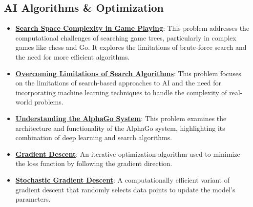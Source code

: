 \documentclass{article}%
\begin{document}
%
\subsection{AI Algorithms \& Optimization}%
\label{subsec:AIAlgorithmsOptimization}%
\begin{itemize}[leftmargin=*]%
\item \href{\url{https://purdue.brightspace.com/d2l/common/assets/pdfjs-d2l-dist/1.0.14-legacy/web/viewer.html?file=\%252Fcontent\%252Fenforced\%252F1095467-wl.202510.CS.24300.001\%252F02L2-Intro.pdf\%253Fou\%253D1095467\&lang=en-us\&container=d2l-fileviewer-rendered-pdf\&fullscreen=d2l-fileviewer-rendered-pdf-dialog\&height=667}#page=11}{\textbf{Search Space Complexity in Game Playing}}: This problem addresses the computational challenges of searching game trees, particularly in complex games like chess and Go. It explores the limitations of brute-force search and the need for more efficient algorithms.%
\item \href{\url{https://purdue.brightspace.com/d2l/common/assets/pdfjs-d2l-dist/1.0.14-legacy/web/viewer.html?file=\%252Fcontent\%252Fenforced\%252F1095467-wl.202510.CS.24300.001\%252F02L2-Intro.pdf\%253Fou\%253D1095467\&lang=en-us\&container=d2l-fileviewer-rendered-pdf\&fullscreen=d2l-fileviewer-rendered-pdf-dialog\&height=667}#page=12}{\textbf{Overcoming Limitations of Search Algorithms}}: This problem focuses on the limitations of search-based approaches to AI and the need for incorporating machine learning techniques to handle the complexity of real-world problems.%
\item \href{\url{https://purdue.brightspace.com/d2l/common/assets/pdfjs-d2l-dist/1.0.14-legacy/web/viewer.html?file=\%252Fcontent\%252Fenforced\%252F1095467-wl.202510.CS.24300.001\%252F02L2-Intro.pdf\%253Fou\%253D1095467\&lang=en-us\&container=d2l-fileviewer-rendered-pdf\&fullscreen=d2l-fileviewer-rendered-pdf-dialog\&height=667}#page=50}{\textbf{Understanding the AlphaGo System}}: This problem examines the architecture and functionality of the AlphaGo system, highlighting its combination of deep learning and search algorithms.%
\item \href{\url{https://purdue.brightspace.com/d2l/common/assets/pdfjs-d2l-dist/1.0.14-legacy/web/viewer.html?file=\%252Fcontent\%252Fenforced\%252F1095467-wl.202510.CS.24300.001\%252F05L2-ML\%20Basics.pdf\%253Fou\%253D1095467\&lang=en-us\&container=d2l-fileviewer-rendered-pdf\&fullscreen=d2l-fileviewer-rendered-pdf-dialog\&height=667}#page=28}{\textbf{Gradient Descent}}: An iterative optimization algorithm used to minimize the loss function by following the gradient direction.%
\item \href{\url{https://purdue.brightspace.com/d2l/common/assets/pdfjs-d2l-dist/1.0.14-legacy/web/viewer.html?file=\%252Fcontent\%252Fenforced\%252F1095467-wl.202510.CS.24300.001\%252F05L2-ML\%20Basics.pdf\%253Fou\%253D1095467\&lang=en-us\&container=d2l-fileviewer-rendered-pdf\&fullscreen=d2l-fileviewer-rendered-pdf-dialog\&height=667}#page=29}{\textbf{Stochastic Gradient Descent}}: A computationally efficient variant of gradient descent that randomly selects data points to update the model's parameters.%
\end{itemize}
\end{document}
